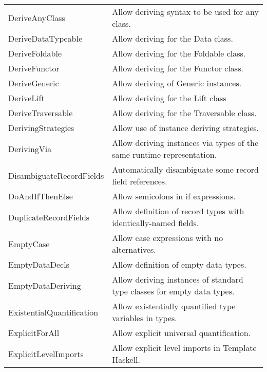 \documentclass[openany, 12pt]{book}
\begin{document}
\begin{center}
\begin{supertabular}{ll}
		DeriveAnyClass             & Allow deriving syntax to be used for any class.                            \\
		DeriveDataTypeable         & Allow deriving for the Data class.                                         \\
		DeriveFoldable             & Allow deriving for the Foldable class.                                     \\
		DeriveFunctor              & Allow deriving for the Functor class.                                      \\
		DeriveGeneric              & Allow deriving of Generic instances.                                       \\
		DeriveLift                 & Allow deriving for the Lift class                                          \\
		DeriveTraversable          & Allow deriving for the Traversable class.                                  \\
		DerivingStrategies         & Allow use of instance deriving strategies.                                 \\
		DerivingVia                & Allow deriving instances via types of the same runtime representation.     \\
		DisambiguateRecordFields   & Automatically disambiguate some record field references.                   \\
		DoAndIfThenElse            & Allow semicolons in if expressions.                                        \\
		DuplicateRecordFields      & Allow definition of record types with identically-named fields.            \\
		EmptyCase                  & Allow case expressions with no alternatives.                               \\
		EmptyDataDecls             & Allow definition of empty data types.                                      \\
		EmptyDataDeriving          & Allow deriving instances of standard type classes for empty data types.    \\
		ExistentialQuantification  & Allow existentially quantified type variables in types.                    \\
		ExplicitForAll             & Allow explicit universal quantification.                                   \\
		ExplicitLevelImports       & Allow explicit level imports in Template Haskell.                          \\

\end{supertabular}
\end{center}
\end{document}
